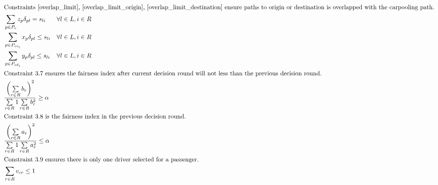 \begin{align}
  \intertext{Constraints \eqref{overlap_limit}, \eqref{overlap_limit_origin}, \eqref{overlap_limit_destination} ensure paths to origin or destination is overlapped with the carpooling path. }
  & \sum\limits_{p \in P_{c}} z_{p} \delta_{pl} = s_{li} && \forall l \in L, i \in R \label{overlap_limit} \\
  & \sum\limits_{p \in P_{co_i}} x_{p} \delta_{pl} \leq s_{li} && \forall l \in L, i \in R \label{overlap_limit_origin} \\
  & \sum\limits_{p \in P_{cd_i}} y_{p} \delta_{pl} \leq s_{li} && \forall l \in L, i \in R \label{overlap_limit_destination} \\
  \intertext{Constraint 3.7 ensures the fairness index after current decision round will not less than the previous decision round.}
  & \frac{\left(\sum\limits_{r \in R} b_r\right)^2}{\sum\limits_{r \in R} 1 \sum\limits_{r \in R} b_r^2} \geq \alpha \\
  \intertext{Constraint 3.8 is the fairness index in the previous decision round.}
  & \frac{\left(\sum\limits_{r \in R} a_r\right)^2}{\sum\limits_{r \in R} 1 \sum\limits_{r \in R} a_r^2} \leq \alpha \\
  \intertext{Constraint 3.9 ensures there is only one driver selected for a passenger.}
  & \sum\limits_{r \in R} v_{cr} \leq 1
\end{align}
